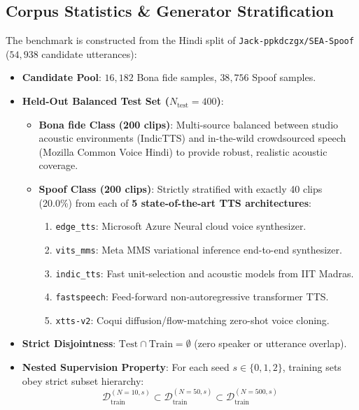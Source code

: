 \documentclass[11pt,a4paper]{article}
\begin{document}
\subsection{Corpus Statistics \& Generator Stratification}
The benchmark is constructed from the Hindi split of \texttt{Jack-ppkdczgx/SEA-Spoof} ($54,938$ candidate utterances):
\begin{itemize}
    \item \textbf{Candidate Pool}: $16,182$ Bona fide samples, $38,756$ Spoof samples.
    \item \textbf{Held-Out Balanced Test Set ($N_{\text{test}} = 400$)}:
    \begin{itemize}
        \item \textbf{Bona fide Class (200 clips)}: Multi-source balanced between studio acoustic environments (IndicTTS) and in-the-wild crowdsourced speech (Mozilla Common Voice Hindi) to provide robust, realistic acoustic coverage.
        \item \textbf{Spoof Class (200 clips)}: Strictly stratified with exactly 40 clips (20.0\%) from each of \textbf{5 state-of-the-art TTS architectures}:
        \begin{enumerate}
            \item \texttt{edge\_tts}: Microsoft Azure Neural cloud voice synthesizer.
            \item \texttt{vits\_mms}: Meta MMS variational inference end-to-end synthesizer.
            \item \texttt{indic\_tts}: Fast unit-selection and acoustic models from IIT Madras.
            \item \texttt{fastspeech}: Feed-forward non-autoregressive transformer TTS.
            \item \texttt{xtts-v2}: Coqui diffusion/flow-matching zero-shot voice cloning.
        \end{enumerate}
    \end{itemize}
    \item \textbf{Strict Disjointness}: $\text{Test} \cap \text{Train} = \emptyset$ (zero speaker or utterance overlap).
    \item \textbf{Nested Supervision Property}: For each seed $s \in \{0, 1, 2\}$, training sets obey strict subset hierarchy:
    \begin{equation}
    \mathcal{D}_{\text{train}}^{(N=10, s)} \subset \mathcal{D}_{\text{train}}^{(N=50, s)} \subset \mathcal{D}_{\text{train}}^{(N=500, s)}
    \end{equation}
\end{itemize}
\end{document}
